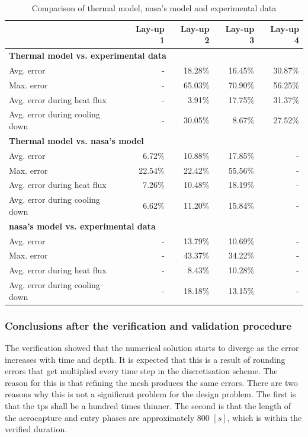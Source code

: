 \begin{table}[h]
	\centering
	\caption{Comparison of thermal model, \acrshort{nasa}'s model and experimental data}
	\begin{tabular}{|p{5.6cm}|rrrr|}
		\hline
		\textbf{} & \textbf{Lay-up 1} & \textbf{Lay-up 2} & \textbf{Lay-up 3} & \textbf{Lay-up 4} \\ \hline \hline
		\multicolumn{5}{|l|}{\textbf{Thermal model vs. experimental data}}			\\ \hline	
		Avg. error											&        - & 18.28\% & 16.45\% & 30.87\% \\
		Max. error											&        - & 65.03\% & 70.90\% & 56.25\% \\
		Avg. error during heat flux							&        - &  3.91\% & 17.75\% & 31.37\% \\
		Avg. error during cooling down						&        - & 30.05\% &  8.67\% & 27.52\% \\ \hline
		\multicolumn{5}{|l|}{\textbf{Thermal model vs. \gls{nasa}'s model}}			\\ \hline		
		Avg. error											&   6.72\% & 10.88\% & 17.85\% &        - \\
		Max. error											&  22.54\% & 22.42\% & 55.56\% &        - \\
		Avg. error during heat flux							&   7.26\% & 10.48\% & 18.19\% &        - \\
		Avg. error during cooling down						&   6.62\% & 11.20\% & 15.84\% &        - \\ \hline
		\multicolumn{5}{|l|}{\textbf{\gls{nasa}'s model vs. experimental data}}			\\ \hline		
		Avg. error											&        - & 13.79\% & 10.69\% &        - \\
		Max. error											&        - & 43.37\% & 34.22\% &        - \\
		Avg. error during heat flux							&        - &  8.43\% & 10.28\% &        - \\
		Avg. error during cooling down						&        - & 18.18\% & 13.15\% &        - \\ \hline
	\end{tabular}
	\label{tab:valerrorthermo}
\end{table}


\subsubsection{Conclusions after the verification and validation procedure}
The verification showed that the numerical solution starts to diverge as the error increases with time and depth. It is expected that this is a result of rounding errors that get multiplied every time step in the discretisation scheme. The reason for this is that refining the mesh produces the same errors. There are two reasons why this is not a significant problem for the design problem. The first is that the \gls{tps} shall be a hundred times thinner. The second is that the length of the aerocapture and entry phases are approximately 800 $\left[s\right]$, which is within the verified duration. 
 
